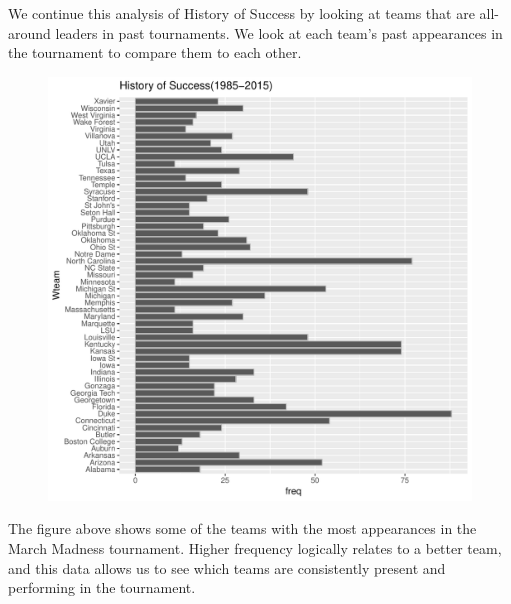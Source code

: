 \documentclass[]{scrartcl}
\begin{document}
We continue this analysis of History of Success by looking at teams that are all-around leaders in past tournaments. We look at each team's past appearances in the tournament to compare them to each other.
\begin{figure}[H]
	\centering
	\includegraphics[scale=.5]{HistOfSuccess2.pdf}
\end{figure}
The figure above shows some of the teams with the most appearances in the March Madness tournament. Higher frequency logically relates to a better team, and this data allows us to see which teams are consistently present and performing in the tournament.
\end{document}

